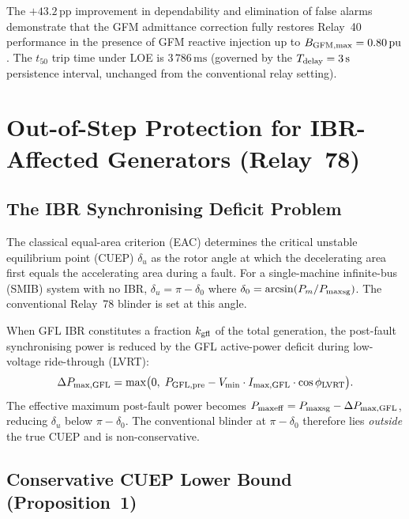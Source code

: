 The $+43.2$\,pp improvement in dependability and elimination of false alarms
demonstrate that the GFM admittance correction fully restores Relay~40
performance in the presence of GFM reactive injection up to
$B_{\rm GFM,max} = 0.80\,\text{pu}$.
The $t_{50}$ trip time under LOE is $3\,786\,\text{ms}$ (governed by the
$T_{\rm delay} = 3\,\text{s}$ persistence interval, unchanged from the
conventional relay setting).

\section{Out-of-Step Protection for IBR-Affected Generators (Relay~78)}
\label{sec:ch6_relay78}

\subsection{The IBR Synchronising Deficit Problem}
\label{sec:ch6_relay78_problem}

The classical equal-area criterion (EAC) determines the critical unstable
equilibrium point (CUEP) $\delta_u$ as the rotor angle at which the
decelerating area first equals the accelerating area during a fault.
For a single-machine infinite-bus (SMIB) system with no IBR,
$\delta_u = \pi - \delta_0$ where $\delta_0 = \arcsin(P_m/P_{\rm maxsg})$.
The conventional Relay~78 blinder is set at this angle.

When GFL IBR constitutes a fraction $k_{\rm gfl}$ of the total generation,
the post-fault synchronising power is reduced by the GFL active-power deficit
during low-voltage ride-through (LVRT):
\begin{equation}
  \Delta P_{\rm max,GFL} = \max\bigl(0,\;
    P_{\rm GFL,pre} - V_{\rm min} \cdot I_{\rm max,GFL} \cdot \cos\phi_{\rm LVRT}\bigr).
  \label{eq:ch6_gfl_deficit}
\end{equation}
The effective maximum post-fault power becomes
$P_{\rm maxeff} = P_{\rm maxsg} - \Delta P_{\rm max,GFL}$,
reducing $\delta_u$ below $\pi - \delta_0$.
The conventional blinder at $\pi - \delta_0$ therefore lies \emph{outside}
the true CUEP and is non-conservative.

\subsection{Conservative CUEP Lower Bound (Proposition~1)}
\label{sec:ch6_relay78_prop}

